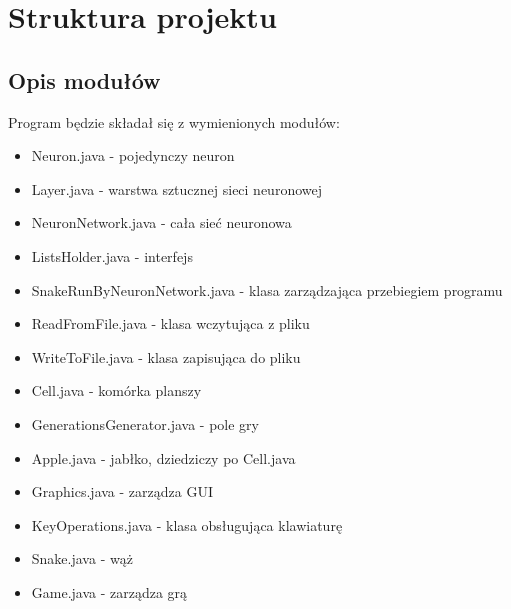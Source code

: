 \documentclass[12pt]{article}
\begin{document}
	\section {Struktura projektu}
		\subsection {Opis modułów}
			Program będzie składał się z wymienionych modułów:
			\begin{itemize}
				\item Neuron.java - pojedynczy neuron
				\item Layer.java - warstwa sztucznej sieci neuronowej
				\item NeuronNetwork.java - cała sieć neuronowa
				\item ListsHolder.java - interfejs
				\item SnakeRunByNeuronNetwork.java - klasa zarządzająca przebiegiem programu
				\item ReadFromFile.java - klasa wczytująca z pliku
				\item WriteToFile.java - klasa zapisująca do pliku
				\item Cell.java - komórka planszy
				\item GenerationsGenerator.java - pole gry
				\item Apple.java - jabłko, dziedziczy po Cell.java
				\item Graphics.java - zarządza GUI
				\item KeyOperations.java - klasa obsługująca klawiaturę
				\item Snake.java - wąż
				\item Game.java - zarządza grą			
			\end{itemize}
\end{document}
